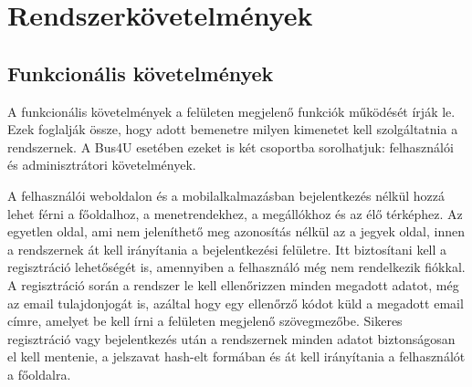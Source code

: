 \newpage
\section{Rendszerkövetelmények}
\subsection{Funkcionális követelmények}

A funkcionális követelmények a felületen megjelenő funkciók működését írják le. Ezek foglalják össze, hogy adott bemenetre milyen kimenetet kell szolgáltatnia a rendszernek. A Bus4U esetében ezeket is két csoportba sorolhatjuk: felhasználói és adminisztrátori követelmények.

A felhasználói weboldalon és a mobilalkalmazásban bejelentkezés nélkül hozzá lehet férni a főoldalhoz, a menetrendekhez, a megállókhoz és az élő térképhez. Az egyetlen oldal, ami nem jeleníthető meg azonosítás nélkül az a jegyek oldal, innen a rendszernek át kell irányítania a bejelentkezési felületre. Itt biztosítani kell a regisztráció lehetőségét is, amennyiben a felhasználó még nem rendelkezik fiókkal. A regisztráció során a rendszer le kell ellenőrizzen minden megadott adatot, még az email tulajdonjogát is, azáltal hogy egy ellenőrző kódot küld a megadott email címre, amelyet be kell írni a felületen megjelenő szövegmezőbe. Sikeres regisztráció vagy bejelentkezés után a rendszernek minden adatot biztonságosan el kell mentenie, a jelszavat hash-elt formában és át kell irányítania a felhasználót a főoldalra.

